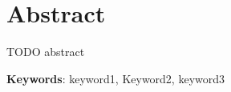 \chapter*{Abstract}

TODO abstract

\vspace*{10mm}\noindent
\textbf{Keywords}: keyword1, Keyword2, keyword3
